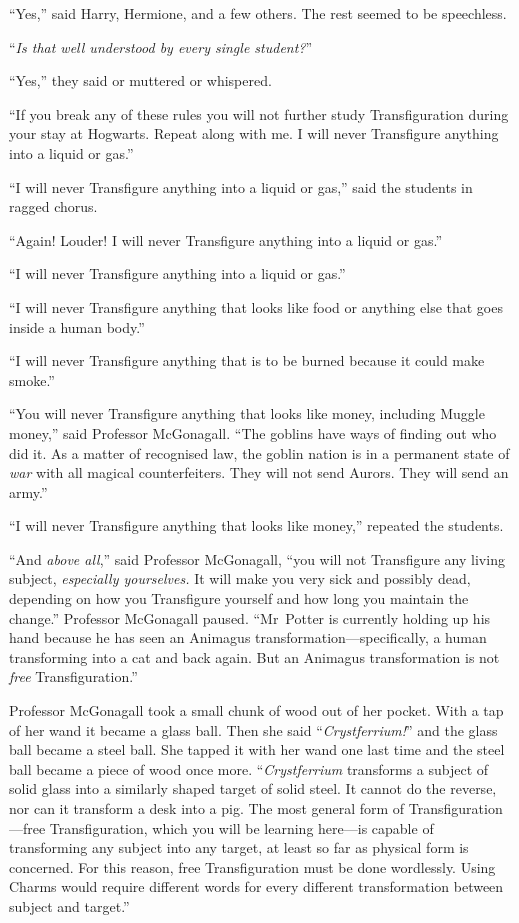 “Yes,” said Harry, Hermione, and a few others. The rest seemed to be speechless.

“\emph{Is that well understood by every single student?}”

“Yes,” they said or muttered or whispered.

“If you break any of these rules you will not further study Transfiguration
during your stay at Hogwarts. Repeat along with me. I will never Transfigure
anything into a liquid or gas.”

“I will never Transfigure anything into a liquid or gas,” said the students in
ragged chorus.

“Again! Louder! I will never Transfigure anything into a liquid or gas.”

“I will never Transfigure anything into a liquid or gas.”

“I will never Transfigure anything that looks like food or anything else that
goes inside a human body.”

“I will never Transfigure anything that is to be burned because it could make
smoke.”

“You will never Transfigure anything that looks like money, including Muggle
money,” said Professor McGonagall. “The goblins have ways of finding out who
did it. As a matter of recognised law, the goblin nation is in a permanent
state of \emph{war} with all magical counterfeiters. They will not send Aurors.
They will send an army.”

“I will never Transfigure anything that looks like money,” repeated the
students.

“And \emph{above all},” said Professor McGonagall, “you will not Transfigure
any living subject, \emph{especially yourselves.} It will make you very sick
and possibly dead, depending on how you Transfigure yourself and how long you
maintain the change.” Professor McGonagall paused. “Mr~Potter is currently
holding up his hand because he has seen an Animagus
transformation—specifically, a human transforming into a cat and back again.
But an Animagus transformation is not \emph{free} Transfiguration.”

Professor McGonagall took a small chunk of wood out of her pocket. With a tap
of her wand it became a glass ball. Then she said “\emph{Crystferrium!}” and
the glass ball became a steel ball. She tapped it with her wand one last time
and the steel ball became a piece of wood once more. “\emph{Crystferrium}
transforms a subject of solid glass into a similarly shaped target of solid
steel. It cannot do the reverse, nor can it transform a desk into a pig. The
most general form of Transfiguration—free Transfiguration, which you will be
learning here—is capable of transforming any subject into any target, at
least so far as physical form is concerned. For this reason, free
Transfiguration must be done wordlessly. Using Charms would require different
words for every different transformation between subject and target.”

